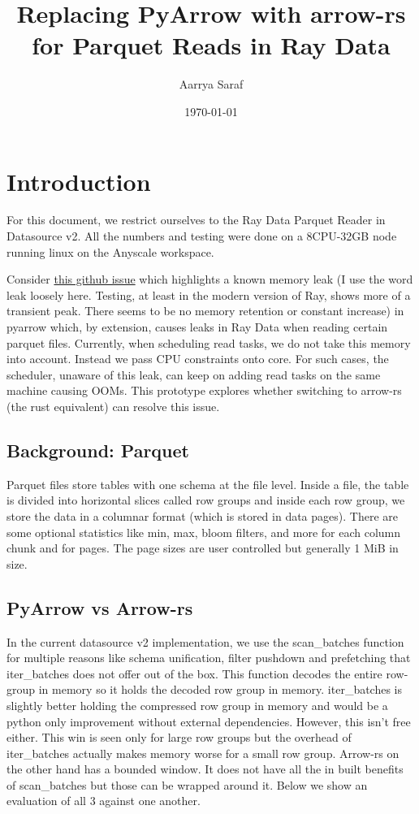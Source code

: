 \documentclass[10pt,twocolumn]{article}
\title{Replacing PyArrow with arrow-rs for Parquet Reads in Ray Data}
\author{Aarrya Saraf}
\date{\today}
\begin{document}
\maketitle

\section{Introduction}
For this document, we restrict ourselves to the Ray Data Parquet Reader in Datasource
v2. All the numbers and testing were done on a 8CPU-32GB node running linux on the
Anyscale workspace.

Consider \href{https://github.com/ray-project/ray/issues/49158}{this github issue} which
highlights a known memory leak (I use the word leak loosely here. Testing, at least in
the modern version of Ray, shows more of a transient peak. There seems to be no memory
retention or constant increase) in pyarrow which, by extension, causes leaks in Ray Data
when reading certain parquet files. Currently, when scheduling read tasks, we do not take
this memory into account. Instead we pass CPU constraints onto core. For such cases, the
scheduler, unaware of this leak, can keep on adding read tasks on the same machine
causing OOMs. This prototype explores whether switching to arrow-rs (the rust equivalent)
can resolve this issue.

\subsection{Background: Parquet}
Parquet files store tables with one schema at the file level. Inside a file, the table is
divided into horizontal slices called row groups and inside each row group, we store the
data in a columnar format (which is stored in data pages). There are some optional
statistics like min, max, bloom filters, and more for each column chunk and for pages.
The page sizes are user controlled but generally 1 MiB in size.

\subsection{PyArrow vs Arrow-rs}
In the current datasource v2 implementation, we use the scan\_batches function for
multiple reasons like schema unification, filter pushdown and prefetching that
iter\_batches does not offer out of the box. This function decodes the entire row-group
in memory so it holds the decoded row group in memory. iter\_batches is slightly better
holding the compressed row group in memory and would be a python only improvement without
external dependencies. However, this isn't free either. This win is seen only for large
row groups but the overhead of iter\_batches actually makes memory worse for a small row
group. Arrow-rs on the other hand has a bounded window. It does not have all the in built
benefits of scan\_batches but those can be wrapped around it. Below we show an evaluation
of all 3 against one another.
\end{document}
